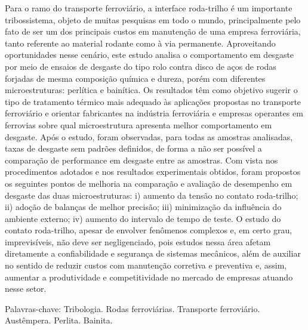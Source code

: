 \documentclass[
12pt,
openany, %
oneside, %
a4paper,			
english,			
brazil			        %
]{abntbibufjf}
\begin{document}
	
		
		
	
			

	
	
	\setlength{\absparsep}{18pt} 
	\begin{resumo}
		
		Para o ramo do transporte ferroviário, a interface roda-trilho é um importante tribossistema, objeto de muitas pesquisas em todo o mundo, principalmente pelo fato de ser um dos principais custos em manutenção de uma empresa ferroviária, tanto referente ao material rodante como à via permanente. Aproveitando oportunidades nesse cenário, este estudo analisa o comportamento em desgaste por meio de ensaios de desgaste do tipo rolo contra disco de aços de rodas forjadas de mesma composição química e dureza, porém com diferentes microestruturas: perlítica e bainítica. Os resultados têm como objetivo sugerir o tipo de tratamento térmico mais adequado às aplicações propostas no transporte ferroviário e orientar fabricantes na indústria ferroviária e empresas operantes em ferrovias sobre qual microestrutura apresenta melhor comportamento em desgaste. Após o estudo, foram observadas, para todas as amostras analisadas, taxas de desgaste sem padrões definidos, de forma a não ser possível a comparação de performance em desgaste entre as amostras. Com vista nos procedimentos adotados e nos resultados experimentais obtidos, foram propostos os seguintes pontos de melhoria na comparação e avaliação de desempenho em desgaste das duas microestruturas: i) aumento da tensão no contato roda-trilho; ii) adoção de balanças de melhor precisão; iii) minimização da influência do ambiente externo; iv) aumento do intervalo de tempo de teste. O estudo do contato roda-trilho, apesar de envolver fenômenos complexos e, em certo grau, imprevisíveis, não deve ser negligenciado, pois estudos nessa área afetam diretamente a confiabilidade e segurança de sistemas mecânicos, além de auxiliar no sentido de reduzir custos com manutenção corretiva e preventiva e, assim, aumentar a produtividade e competitividade no mercado de empresas atuando nesse setor.
		
		Palavras-chave: Tribologia. Rodas ferroviárias. Transporte ferroviário. Austêmpera. Perlita. Bainita. %
		
	\end{resumo}
	
\end{document}
